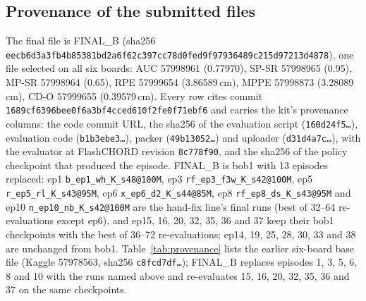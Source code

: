 \documentclass[10pt]{nvidiaextabstract}
\begin{document}
\subsection{Provenance of the submitted files}
\label{app:provenance}
The final file is FINAL\_B (sha256 \texttt{eecb6d3a\allowbreak 3fb4b853\allowbreak 81bd2a6f\allowbreak 62c397cc\allowbreak 78d0fed9\allowbreak f9793648\allowbreak 9c215d97\allowbreak 213d4878}), one file selected on all six boards: AUC 57998961 (0.77970), SP-SR 57998965 (0.95), MP-SR 57998964 (0.65), RPE 57999654 (3.86589\,cm), MPPE 57998873 (3.28089\,cm), CD-O 57999655 (0.39579\,cm). Every row cites commit \texttt{1689cf63\allowbreak 96bee0f6\allowbreak a3bf4cce\allowbreak d610f2fe\allowbreak 0f71ebf6} and carries the kit's provenance columns: the code commit URL, the sha256 of the evaluation script (\texttt{160d24f5\ldots}), evaluation code (\texttt{b1b3ebe3\ldots}), packer (\texttt{49b13052\ldots}) and uploader (\texttt{d31d4a7c\ldots}), with the evaluator at FlashCHORD revision \texttt{8c778f90}, and the sha256 of the policy checkpoint that produced the episode. FINAL\_B is bob1 with 13 episodes replaced: ep1 \texttt{b\_ep1\_wh\_K\_s48@100M}, ep3 \texttt{rf\_ep3\_f3w\_K\_s42@100M}, ep5 \texttt{r\_ep5\_rl\_K\_s43@95M}, ep6 \texttt{x\_ep6\_d2\_K\_s44@85M}, ep8 \texttt{rf\_ep8\_ds\_K\_s43@95M} and ep10 \texttt{n\_ep10\_nb\_K\_s42@100M} are the hand-fix line's final runs (best of 32--64 re-evaluations except ep6), and ep15, 16, 20, 32, 35, 36 and 37 keep their bob1 checkpoints with the best of 36--72 re-evaluations; ep14, 19, 25, 28, 30, 33 and 38 are unchanged from bob1. Table~\ref{tab:provenance} lists the earlier six-board base file (Kaggle 57978563, sha256 \texttt{c8fcd7df\ldots}); FINAL\_B replaces episodes 1, 3, 5, 6, 8 and 10 with the runs named above and re-evaluates 15, 16, 20, 32, 35, 36 and 37 on the same checkpoints.
\end{document}
